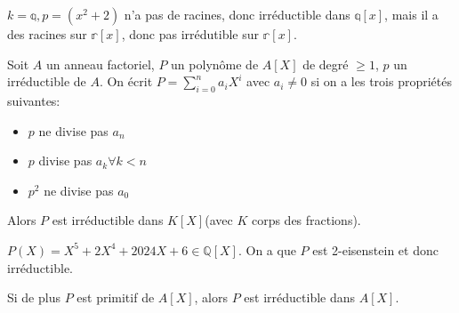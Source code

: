 \begin{exemple}
	$k = \mathbb{q}, p = (x^2 + 2 )$ n'a pas de racines, donc irréductible dans $\mathbb{q}[x]$, mais il a des racines sur $\mathbb{r}[x]$, donc pas irrédutible sur $\mathbb{r}[x]$.
\end{exemple}


\begin{theorem}
	Soit $A$ un anneau factoriel, $P$ un polynôme  de $A[X]$ de degré $\geq 1$, $p$ un irréductible de $A$.
	On écrit $P = \sum_{i=0}^n a_iX^i$ avec $a_i \neq 0$ si on a les trois propriétés suivantes:
	\begin{itemize}
		\item $p$ ne divise pas $a_n$
		\item $p$ divise pas $a_k \forall k < n$
		\item $p^2$ ne divise pas $a_0$
	\end{itemize}
	Alors $P$ est irréductible dans $K[X]$(avec $K$ corps des fractions).
\end{theorem}

\begin{exemple}
	$P(X) = X^5 + 2X^4 + 2024X + 6\in \mathbb{Q}[X]$. On a que $P$ est 2-eisenstein et donc irréductible.
\end{exemple}



\begin{coro}
	Si de plus $P$ est primitif de $A[X]$, alors $P$ est irréductible dans $A[X]$.
\end{coro}
